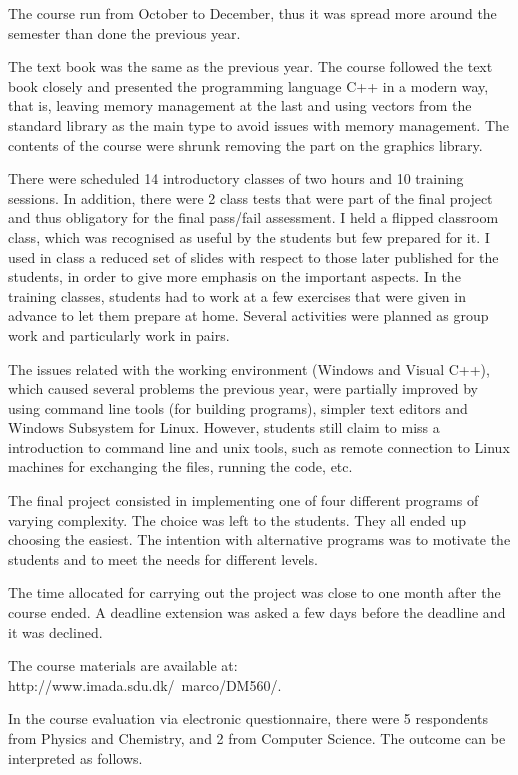 \documentclass[11pt]{article}
\begin{document}
The course run from October to December, thus it was spread more
around the semester than done the previous year.

The text book was the same as the previous year. The course followed
the text book closely and presented the programming language C++ in a
modern way, that is, leaving memory management at the last and using
vectors from the standard library as the main type to avoid issues with
memory management.  The contents of the course were shrunk removing the
part on the graphics library.

There were scheduled 14 introductory classes of two hours and 10
training sessions. In addition, there were 2 class tests that were part
of the final project and thus obligatory for the final pass/fail
assessment. I held a flipped classroom class, which was recognised as
useful by the students but few prepared for it. I used in class a
reduced set of slides with respect to those later published for the
students, in order to give more emphasis on the important aspects.  In
the training classes, students had to work at a few exercises that were
given in advance to let them prepare at home. Several activities were
planned as group work and particularly work in pairs.

The issues related with the working environment (Windows and Visual
C++), which caused several problems the previous year, were partially
improved by using command line tools (for building programs), simpler
text editors and Windows Subsystem for Linux. However, students still
claim to miss a introduction to command line and unix tools, such as
remote connection to Linux machines for exchanging the files, running
the code, etc.

The final project consisted in implementing one of four different
programs of varying complexity. The choice was left to the
students. They all ended up choosing the easiest. The intention with
alternative programs was to motivate the students and to meet the
needs for different levels.

The time allocated for carrying out the project was close to one month
after the course ended. A deadline extension was asked a few days before
the deadline and it was declined.

The course materials are available at:
http://www.imada.sdu.dk/~marco/DM560/.

\medskip
In the course evaluation via electronic questionnaire, there were 5
respondents from Physics and Chemistry, and 2 from Computer Science.
The outcome can be interpreted as follows.
\end{document}
